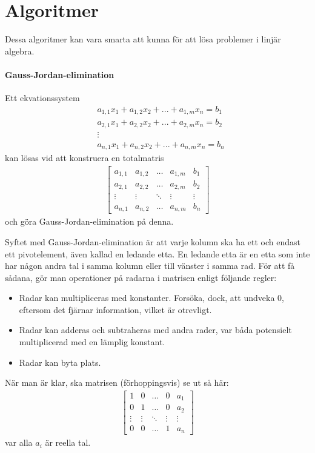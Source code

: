 \twocolumn

\section{Algoritmer}
Dessa algoritmer kan vara smarta att kunna för att lösa problemer i linjär algebra.

\paragraph{Gauss-Jordan-elimination}

Ett ekvationssystem
\begin{align*}
	& a_{1,1}x_1 + a_{1,2}x_2 + ... + a_{1,m}x_n = b_1 \\
	& a_{2,1}x_1 + a_{2,2}x_2 + ... + a_{2,m}x_n = b_2 \\
	& \vdots \\
	& a_{n,1}x_1 + a_{n,2}x_2 + ... + a_{n,m}x_n = b_n
\end{align*}
kan lösas vid att konstruera en totalmatris
\begin{align*}
	\left[\begin{array}{cccc|c}
    	a_{1,1} & a_{1,2} & \dots  & a_{1,m} & b_1 \\
    	a_{2,1} & a_{2,2} & \dots  & a_{2,m} & b_2 \\
    	\vdots  & \vdots  & \ddots & \vdots  & \vdots \\
	    a_{n,1} & a_{n,2} & \dots  & a_{n,m} & b_n
	\end{array}\right]
\end{align*}
och göra Gauss-Jordan-elimination på denna.

Syftet med Gauss-Jordan-elimination är att varje kolumn ska ha ett och endast ett pivotelement, även kallad en ledande etta. En ledande etta är en etta som inte har någon andra tal i samma kolumn eller till vänster i samma rad. För att få sådana, gör man operationer på radarna i matrisen enligt följande regler:
\begin{itemize}
	\item Radar kan multipliceras med konstanter. Forsöka, dock, att undveka $0$, eftersom det fjärnar information, vilket är otrevligt.
	\item Radar kan adderas och subtraheras med andra rader, var båda  potensielt multiplicerad med en lämplig konstant.
	\item Radar kan byta plats.
\end{itemize}

När man är klar, ska matrisen (förhoppingsvis) se ut så här:
\begin{align*}
	\left[\begin{array}{cccc|c}
    	1      & 0      & \dots  & 0      & a_1 \\
    	0      & 1      & \dots  & 0      & a_2 \\
    	\vdots & \vdots & \ddots & \vdots & \vdots \\
	    0      & 0      & \dots  & 1      & a_n
	\end{array}\right]
\end{align*}
var alla $a_i$ är reella tal.